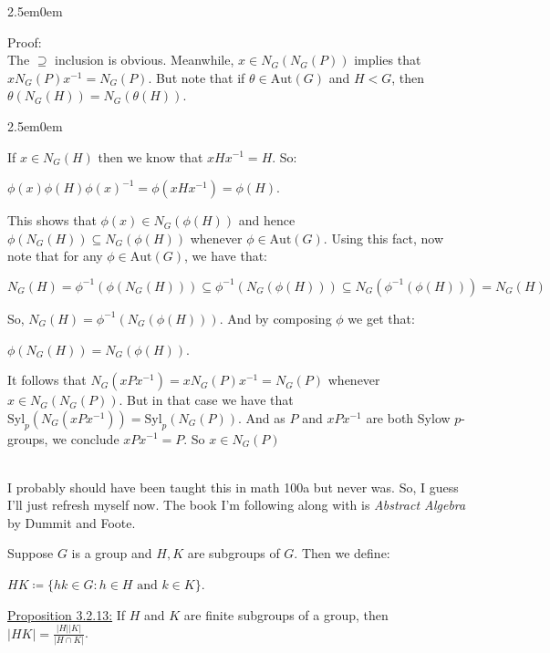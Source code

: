 \documentclass{book}
\newcommand{\hTwo}{%
\color{Black}%
   \fontsize{13}{15}\selectfont%
}
\newcommand{\exTwo}{%
   \color{Purple}%
   \fontsize{13}{15}\selectfont%
}
\newcommand{\exThreeP}{%
   \color{RedViolet}%
   \fontsize{12}{14}\selectfont%
}
\newcommand{\exPPP}{%
   \color{VioletRed}%
   \fontsize{12}{14}\selectfont%
}
\newenvironment{myIndent}{%
   \begin{adjustwidth}{2.5em}{0em}%
}{%
   \end{adjustwidth}%
}
\newcommand{\Aut}{\mathrm{Aut}}
\newcommand{\Syl}{\mathrm{Syl}}
\newcommand{\mySepTwo}[1][.]{%
   {\noindent\color{#1}{\rule{6.5in}{0.5mm}}}\\%
}
\newcommand{\retTwo}{\hfill\bigbreak}
\begin{document}
\begin{myIndent}\exThreeP
	Proof:\\
	The $\supseteq$ inclusion is obvious. Meanwhile, $x \in N_G(N_G(P))$ implies that\\ $xN_G(P)x^{-1} = N_G(P)$. But note that if $\theta \in \Aut(G)$ and $H < G$, then\\ $\theta(N_G(H)) = N_G(\theta(H))$.

	\begin{myIndent}\exPPP
		If $x \in N_G(H)$ then we know that $xHx^{-1} = H$. So:
		
		{\centering $\phi(x)\phi(H)\phi(x)^{-1} = \phi(xHx^{-1}) = \phi(H)$.\retTwo\par}
		
		This shows that $\phi(x) \in N_G(\phi(H))$ and hence $\phi(N_G(H)) \subseteq N_G(\phi(H))$ whenever $\phi \in \Aut(G)$. Using this fact, now note that for any $\phi \in \Aut(G)$, we have that:
		
		{\centering$N_G(H) = \phi^{-1}(\phi(N_G(H))) \subseteq \phi^{-1}(N_G(\phi(H))) \subseteq N_G(\phi^{-1}(\phi(H))) = N_G(H)$\retTwo\par}

		So, $N_G(H) = \phi^{-1}(N_G(\phi(H)))$. And by composing $\phi$ we get that:
		
		{\centering$\phi(N_G(H)) = N_G(\phi(H))$.\retTwo\par}
	\end{myIndent}

	It follows that $N_G(xPx^{-1}) = xN_G(P)x^{-1} = N_G(P)$ whenever $x \in N_G(N_G(P))$. But in that case we have that $\Syl_p(N_G(xPx^{-1})) = \Syl_p(N_G(P))$. And as $P$ and $xPx^{-1}$ are both Sylow $p$-groups, we conclude $xPx^{-1} = P$. So $x \in N_G(P)$
\end{myIndent}

\hTwo\mySepTwo

I probably should have been taught this in math 100a but never was. So, I guess I'll just refresh myself now. The book I'm following along with is \textit{Abstract Algebra} by Dummit and Foote.\retTwo

Suppose $G$ is a group and $H, K$ are subgroups of $G$. Then we define:

{\centering$HK \coloneqq \{ hk \in G : h \in H \text{ and } k \in K\}$.\retTwo\par}

\exTwo\ul{Proposition 3.2.13:} If $H$ and $K$ are finite subgroups of a group, then $|HK| = \frac{|H||K|}{|H\cap K|}$.
\end{document}
